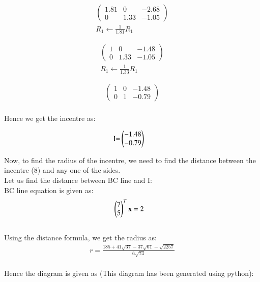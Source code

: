\documentclass[journal,12pt,twocolumn]{IEEEtran}
\theoremstyle{remark}
\begin{document}
\begin{align*}
	\left(
		\begin{array}{rr|r}
			1.81 & 0 & -2.68\\
			0& 1.33 & -1.05
		\end{array}
	\right)\\
	R_{1} \leftarrow \frac{1}{1.81} R_{1} 
\end{align*}

\begin{align*}
	\left(
		\begin{array}{rr|r}
			1 & 0 & -1.48\\
			0& 1.33 & -1.05
		\end{array}
	\right)\\
	R_{1} \leftarrow \frac{1}{1.33} R_{1} 
\end{align*}

\begin{align*}
	\left(
		\begin{array}{rr|r}
			1 & 0 & -1.48\\
			0& 1 & -0.79
		\end{array}
	\right)\\
\end{align*}

\begin{flushleft}
	Hence we get the incentre as:
\end{flushleft}

\begin{align}
	\text{I=}&\begin{pmatrix}
		-1.48 \\
		-0.79
	\end{pmatrix}
\end{align}

\begin{flushleft}
    Now, to find the radius of the incentre, we need to find the distance between 
    the incentre (8) and any one of the sides. 
    \\
    Let us find the distance between BC line and I:
    \\
    BC line equation is given as:
    \bigskip
    \begin{align}
    &\begin{pmatrix}
        7 \\
        5
	\end{pmatrix}^{T}	
    \mathbf {x} = 2
    \end{align}
    \\
    Using the distance formula, we get the radius as:
    \\
    \begin{align}
    r = \frac{185+41\sqrt{37}-37\sqrt{61}-\sqrt{2257}}{6\sqrt{74}}
    \end{align}
    \\Hence the diagram is given as (This diagram has been generated using python):
    \\
\end{flushleft}
\end{document}
